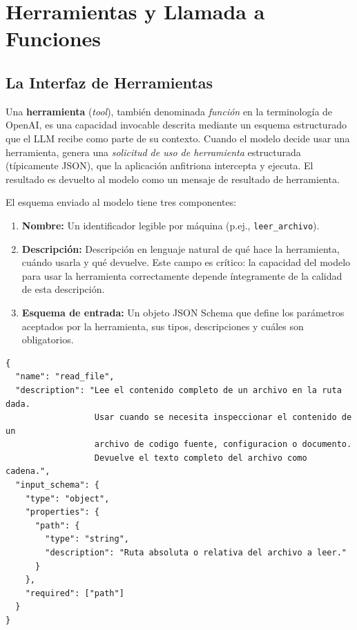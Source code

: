 \documentclass[11pt,letterpaper]{article}
\begin{document}
\section{Herramientas y Llamada a Funciones}

\subsection{La Interfaz de Herramientas}

Una \textbf{herramienta} (\textit{tool}), también denominada \emph{función} en la terminología de OpenAI, es una capacidad invocable descrita mediante un esquema estructurado que el LLM recibe como parte de su contexto. Cuando el modelo decide usar una herramienta, genera una \emph{solicitud de uso de herramienta} estructurada (típicamente JSON), que la aplicación anfitriona intercepta y ejecuta. El resultado es devuelto al modelo como un mensaje de resultado de herramienta.

El esquema enviado al modelo tiene tres componentes:
\begin{enumerate}[leftmargin=*]
    \item \textbf{Nombre:} Un identificador legible por máquina (p.ej., \texttt{leer\_archivo}).
    \item \textbf{Descripción:} Descripción en lenguaje natural de qué hace la herramienta, cuándo usarla y qué devuelve. Este campo es crítico: la capacidad del modelo para usar la herramienta correctamente depende íntegramente de la calidad de esta descripción.
    \item \textbf{Esquema de entrada:} Un objeto JSON Schema que define los parámetros aceptados por la herramienta, sus tipos, descripciones y cuáles son obligatorios.
\end{enumerate}

\begin{lstlisting}[style=JSONStyle, caption={Definición de herramienta en formato API de Anthropic}]
{
  "name": "read_file",
  "description": "Lee el contenido completo de un archivo en la ruta dada.
                  Usar cuando se necesita inspeccionar el contenido de un
                  archivo de codigo fuente, configuracion o documento.
                  Devuelve el texto completo del archivo como cadena.",
  "input_schema": {
    "type": "object",
    "properties": {
      "path": {
        "type": "string",
        "description": "Ruta absoluta o relativa del archivo a leer."
      }
    },
    "required": ["path"]
  }
}
\end{lstlisting}
\end{document}
